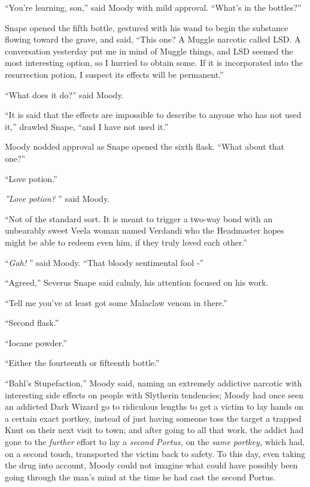 ``You're learning, son,'' said Moody with mild approval. ``What's in the
bottles?''

Snape opened the fifth bottle, gestured with his wand to begin the
substance flowing toward the grave, and said, ``This one? A Muggle
narcotic called LSD. A conversation yesterday put me in mind of Muggle
things, and LSD seemed the most interesting option, so I hurried to
obtain some. If it is incorporated into the resurrection potion, I
suspect its effects will be permanent.''

``What does it do?'' said Moody.

``It is said that the effects are impossible to describe to anyone who
has not used it,'' drawled Snape, ``and I have not used it.''

Moody nodded approval as Snape opened the sixth flask. ``What about that
one?''

``Love potion.''

\emph{''Love potion?} '' said Moody.

``Not of the standard sort. It is meant to trigger a two-way bond with
an unbearably sweet Veela woman named Verdandi who the Headmaster hopes
might be able to redeem even him, if they truly loved each other.''

``\emph{Gah!} '' said Moody. ``That bloody sentimental fool -''

``Agreed,'' Severus Snape said calmly, his attention focused on his
work.

``Tell me you've at least got some Malaclaw venom in there.''

``Second flask.''

``Iocane powder.''

``Either the fourteenth or fifteenth bottle.''

``Bahl's Stupefaction,'' Moody said, naming an extremely addictive
narcotic with interesting side effects on people with Slytherin
tendencies; Moody had once seen an addicted Dark Wizard go to ridiculous
lengths to get a victim to lay hands on a certain exact portkey, instead
of just having someone toss the target a trapped Knut on their next
visit to town; and after going to all that work, the addict had gone to
the \emph{further} effort to lay a \emph{second Portus,} on the
\emph{same portkey,} which had, on a second touch, transported the
victim back to safety. To this day, even taking the drug into account,
Moody could not imagine what could have possibly been going through the
man's mind at the time he had cast the second Portus.

